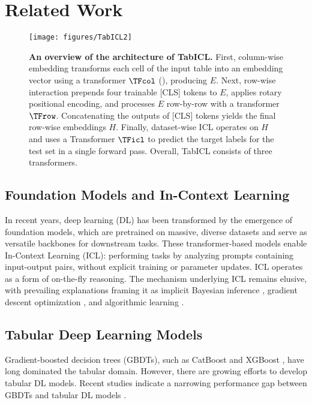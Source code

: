 \section{Related Work}
\label{sec:related}

\begin{figure*}
	\centering
	\texttt{[image: figures/TabICL2]}
	\caption{\textbf{An overview of the architecture of TabICL.} First, column-wise embedding transforms each cell of the input table into an embedding vector using a transformer $\TFcol$ (), producing $E$. Next, row-wise interaction prepends four trainable [CLS] tokens to $E$, applies rotary positional encoding, and processes $E$ row-by-row with a transformer $\TFrow$. Concatenating the outputs of [CLS] tokens yields the final row-wise embeddings $H$. Finally, dataset-wise ICL operates on $H$ and uses a Transformer $\TFicl$ to predict the target labels for the test set in a single forward pass. Overall, TabICL consists of three transformers.}
    \label{fig:arch}
\end{figure*}

\subsection{Foundation Models and In-Context Learning}

In recent years, deep learning (DL) has been transformed by the emergence of foundation models, which are pretrained on massive, diverse datasets and serve as versatile backbones for downstream tasks. These transformer-based models enable In-Context Learning (ICL): performing tasks by analyzing prompts containing input-output pairs, without explicit training or parameter updates. ICL operates as a form of on-the-fly reasoning. The mechanism underlying ICL remains elusive, with prevailing explanations framing it as implicit Bayesian inference \cite{xieExplanationIncontextLearning2022,mullerTransformersCanBayesian2024}, gradient descent optimization \cite{vonoswaldTransformersLearnIncontext2023}, and algorithmic learning \cite{gargWhatCanTransformers2023}.

\subsection{Tabular Deep Learning Models}

Gradient-boosted decision trees (GBDTs), such as CatBoost and XGBoost \cite{chenXGBoostScalableTree2016a}, have long dominated the tabular domain. However, there are growing efforts to develop tabular DL models. Recent studies indicate a narrowing performance gap between GBDTs and tabular DL models \cite{yeModernNeighborhoodComponents2024,gorishniyTabMAdvancingTabular2024}.

